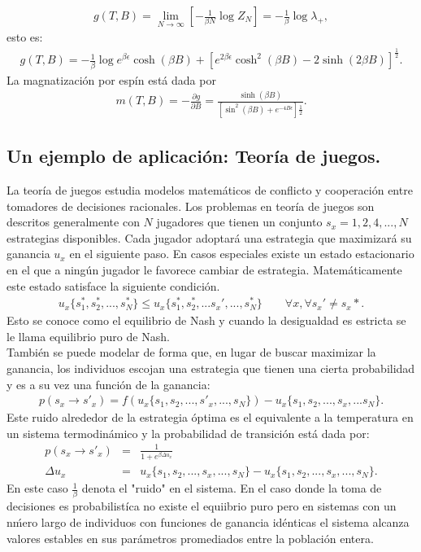 \documentclass[letterpaper,12pt,oneside]{book}
\begin{document}
%
\begin{eqnarray}
g(T,B)=\lim_{N\to\infty}\left[-\frac{1}{\beta N}\log Z_N\right]=-\frac{1}{\beta}\log\lambda_{+},
\end{eqnarray}
%
esto es:
%
\begin{eqnarray}
g(T,B)=-\frac{1}{\beta}\log{e^{\beta \epsilon} \cosh(\beta B) + \left[e^{2\beta \epsilon } \cosh^2 (\beta B) - 2\sinh (2\beta B)\right]^{\frac{1}{2}}}.
\end{eqnarray}
%
La magnatizaci\'on por esp\'in est\'a dada por 
%
\begin{eqnarray}
m(T,B)=-\frac{\partial g}{\partial B} = \frac{\sinh(\beta B)}{[\sin^2(\beta B)+ e^{-4 B\epsilon}]\frac{1}{2}}.
\end{eqnarray}
%


\subsection{Un ejemplo de aplicaci\'on: Teoría de juegos.}
La teor\'ia de juegos estudia modelos matem\'aticos de conflicto y cooperaci\'on entre tomadores de decisiones racionales. Los problemas en teor\'ia de juegos son descritos generalmente con $N$ jugadores que tienen un conjunto $s_x = {1,2,4,...,N}$ estrategias disponibles. Cada jugador adoptar\'a una estrategia que maximizar\'a su ganancia $u_x$ en el siguiente paso. En casos especiales existe un estado estacionario en el que a ning\'un jugador le favorece cambiar de estrategia. Matem\'aticamente este estado satisface la siguiente condici\'on.
%
\begin{eqnarray}
  u_x \{s_1^*, s_2^*, ..., s_N^*\} \leq u_x\{s_1^*, s_2^*, ...s_x',..., s_N^*\} \qquad \forall x, \forall s_x' \neq s_x*.
\end{eqnarray}%
Esto se conoce como el equilibrio de Nash y cuando la desigualdad es estricta se le llama equilibrio puro de Nash.\\
Tambi\'en se puede modelar de forma que, en lugar de buscar maximizar la ganancia, los individuos escojan una estrategia que tienen una cierta probabilidad y es a su vez una función de la ganancia: 
%
\begin{eqnarray}
  p(s_x \to s'_x) = f(u_x \{s_1, s_2, ... , s'_x, ..., s_N\}) - u_x\{s_1, s_2, ... , s_x, ... s_N\}.
\end{eqnarray}
%
Este ruido alrededor de la estrategia \'optima es el equivalente a la temperatura en un sistema termodin\'amico y la probabilidad de transici\'on est\'a dada por: 
%
\begin{eqnarray}
  p(s_x \to s'_x) &=& \frac{1}{1+e^{\beta \Delta u_x}}\\
  \Delta u_x &=& u_x\{s_1, s_2, ... , s_x, ..., s_N\} - u_x\{s_1, s_2, ... ,s_x, ..., s_N\}.
\end{eqnarray}
%
En este caso $\frac{1}{\beta}$ denota el "ruido" en el sistema. En el caso donde la toma de decisiones es probabilist\'ica no existe el equiibrio puro pero en sistemas con un n\'mero largo de individuos con funciones de ganancia id\'enticas el sistema alcanza valores estables en sus par\'ametros promediados entre la poblaci\'on entera.
\end{document}

